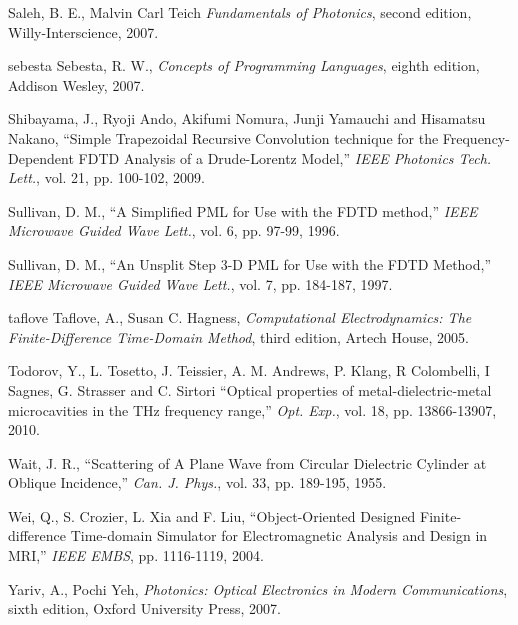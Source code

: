 \begin{thebibliography}{999}
  \bibitem
  {}
  Saleh, B. E., Malvin Carl Teich
  \textit{Fundamentals of Photonics}, second edition,
  Willy-Interscience,
  2007.

  \bibitem
  {sebesta}
  Sebesta, R. W.,
  \textit{Concepts of Programming Languages}, eighth edition,
  Addison Wesley,
  2007.

  \bibitem
  {}  
  Shibayama, J., Ryoji Ando, Akifumi Nomura, Junji Yamauchi and Hisamatsu Nakano,
  ``Simple Trapezoidal Recursive Convolution technique for the Frequency-Dependent FDTD Analysis of a Drude-Lorentz Model,''
  \textit{IEEE Photonics Tech. Lett.},
  vol. 21,
  pp. 100-102,
  2009.

  \bibitem
  {}
  Sullivan, D. M.,
  ``A Simplified PML for Use with the FDTD method,''
  \textit{IEEE Microwave Guided Wave Lett.},
  vol. 6,
  pp. 97-99,
  1996.

  \bibitem
  {}
  Sullivan, D. M.,
  ``An Unsplit Step 3-D PML for Use with the FDTD Method,''
  \textit{IEEE Microwave Guided Wave Lett.}, 
  vol. 7,
  pp. 184-187,
  1997.

  \bibitem
  {taflove}
  Taflove, A., Susan C. Hagness, 
  \textit{Computational Electrodynamics: The Finite-Difference Time-Domain Method}, third edition,
  Artech House,
  2005.

  \bibitem
  {}
  Todorov, Y., L. Tosetto, J. Teissier, A. M. Andrews, P. Klang, R Colombelli, I Sagnes, G. Strasser and C. Sirtori
  ``Optical properties of metal-dielectric-metal microcavities in the THz frequency range,''
  \textit{Opt. Exp.},
  vol. 18,
  pp. 13866-13907,
  2010.

  \bibitem
  {}
  Wait, J. R.,
  ``Scattering of A Plane Wave from Circular Dielectric Cylinder at Oblique Incidence,''
  \textit{Can. J. Phys.},
  vol. 33,
  pp. 189-195,
  1955.

  \bibitem
  {}
  Wei, Q., S. Crozier, L. Xia and F. Liu,
  ``Object-Oriented Designed Finite-difference Time-domain Simulator for Electromagnetic Analysis and Design in MRI,''
  \textit{IEEE EMBS},
  pp. 1116-1119,
  2004.

  \bibitem
  {}
  Yariv, A., Pochi Yeh,
  \textit{Photonics: Optical Electronics in Modern Communications}, sixth edition,
  Oxford University Press, 
  2007.

\end{thebibliography}
